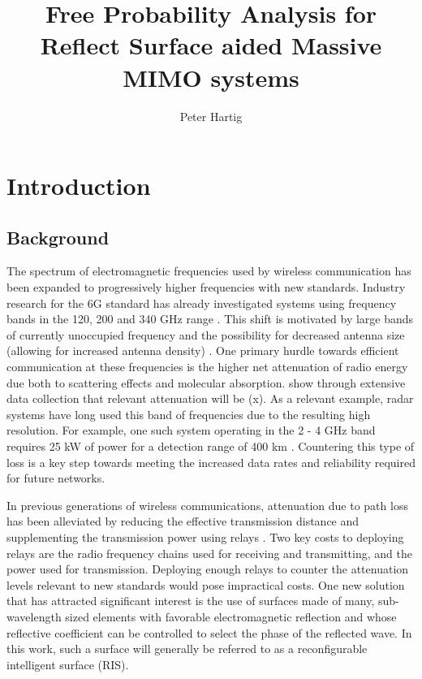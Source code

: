 \documentclass[12pt,a4paper]{report}
\title{Free Probability Analysis for Reflect Surface aided Massive MIMO systems}
\author{Peter Hartig}
\begin{document}
\maketitle
\begin{abstract}

\end{abstract}
%
\tableofcontents
\chapter{Introduction}
\section{Background}\label{Background}
The spectrum of electromagnetic frequencies used by wireless communication has been expanded to progressively higher frequencies with new standards. Industry research for the 6G standard has already investigated systems using frequency bands in the 120, 200 and 340 GHz range \cite{Koziol}. This shift is motivated by large bands of currently unoccupied frequency and the possibility for decreased antenna size (allowing for increased antenna density) \cite{akyildiz2018combating}. One primary hurdle towards efficient communication at these frequencies is the higher net attenuation of radio energy due both to scattering effects and molecular absorption. \cite{TODO} show through extensive data collection that relevant attenuation will be (x). 
As a relevant example, radar systems have long used this band of frequencies due to the resulting high resolution. For example, one such system operating in the 2 - 4 GHz band requires 25 kW of power for a detection range of 400 km \cite{TODO}. 
Countering this type of loss is a key step towards meeting the increased data rates and reliability required for future networks. 
\par
In previous generations of wireless communications, attenuation due to path loss has been alleviated by reducing the effective transmission distance 
and supplementing the transmission power using relays \cite{dahlman20134g}. Two key costs to deploying relays are the radio frequency chains used for receiving and transmitting, and the power used for transmission. Deploying enough relays to counter
the attenuation levels relevant to new standards would pose impractical costs. One new solution that has attracted significant interest is the use of surfaces made of many, sub-wavelength sized elements with favorable electromagnetic reflection and whose reflective coefficient can be controlled to select the phase of the reflected wave. In this work, such a surface will generally be referred to as a reconfigurable intelligent surface (RIS).
\end{document}

